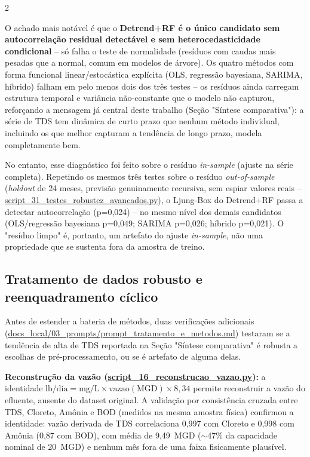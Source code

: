 \begin{multicols*}{2}

O achado mais notável é que o \textbf{Detrend+RF é o único candidato sem autocorrelação residual detectável e sem heterocedasticidade condicional} -- só falha o teste de normalidade (resíduos com caudas mais pesadas que a normal, comum em modelos de árvore). Os quatro métodos com forma funcional linear/estocástica explícita (OLS, regressão bayesiana, SARIMA, híbrido) falham em pelo menos dois dos três testes -- os resíduos ainda carregam estrutura temporal e variância não-constante que o modelo não capturou, reforçando a mensagem já central deste trabalho (Seção "Síntese comparativa"): a série de TDS tem dinâmica de curto prazo que nenhum método individual, incluindo os que melhor capturam a tendência de longo prazo, modela completamente bem.

No entanto, esse diagnóstico foi feito sobre o resíduo \textit{in-sample} (ajuste na série completa). Repetindo os mesmos três testes sobre o resíduo \textit{out-of-sample} (\textit{holdout} de 24 meses, previsão genuinamente recursiva, sem espiar valores reais -- \url{script_31_testes_robustez_avancados.py}), o Ljung-Box do Detrend+RF passa a detectar autocorrelação (p=0,024) -- no mesmo nível dos demais candidatos (OLS/regressão bayesiana p=0,049; SARIMA p=0,026; híbrido p=0,021). O "resíduo limpo" é, portanto, um artefato do ajuste \textit{in-sample}, não uma propriedade que se sustenta fora da amostra de treino.

\subsection{Tratamento de dados robusto e reenquadramento cíclico}

Antes de estender a bateria de métodos, duas verificações adicionais (\url{docs_local/03_prompts/prompt_tratamento_e_metodos.md}) testaram se a tendência de alta de TDS reportada na Seção "Síntese comparativa" é robusta a escolhas de pré-processamento, ou se é artefato de alguma delas.

\textbf{Reconstrução da vazão (\url{script_16_reconstrucao_vazao.py}):} a identidade $\mathrm{lb/dia} = \mathrm{mg/L} \times \mathrm{vazao(MGD)} \times 8{,}34$ permite reconstruir a vazão do efluente, ausente do dataset original. A validação por consistência cruzada entre TDS, Cloreto, Amônia e BOD (medidos na mesma amostra física) confirmou a identidade: vazão derivada de TDS correlaciona 0,997 com Cloreto e 0,998 com Amônia (0,87 com BOD), com média de 9,49~MGD ($\sim$47\% da capacidade nominal de 20~MGD) e nenhum mês fora de uma faixa fisicamente plausível.


\end{multicols*}

